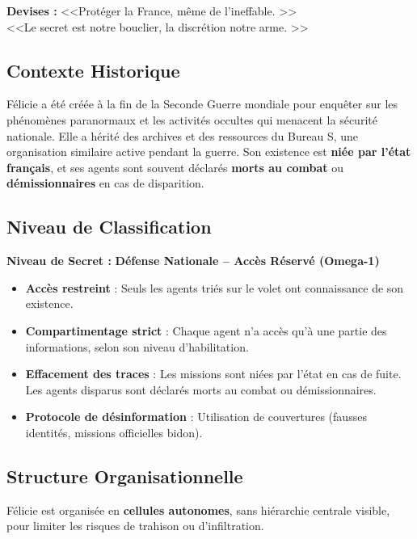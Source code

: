\documentclass[10pt,a5paper,twoside]{book}
\begin{document}
\begin{shaded}
	\textbf{Devises :} <<Protéger la France, même de l'ineffable. >> \\ <<Le secret est notre bouclier, la discrétion notre arme. >>
\end{shaded}

\subsection{Contexte Historique}

Félicie a été créée à la fin de la Seconde Guerre mondiale pour enquêter sur les phénomènes paranormaux et les activités occultes qui menacent la sécurité nationale. Elle a hérité des archives et des ressources du Bureau S, une organisation similaire active pendant la guerre. Son existence est \textbf{niée par l'état français}, et ses agents sont souvent déclarés \textbf{morts au combat} ou \textbf{démissionnaires} en cas de disparition.

\subsection{Niveau de Classification}
\begin{shaded}
	\textbf{Niveau de Secret :} \textbf{Défense Nationale -- Accès Réservé (Omega-1)}
	\begin{itemize}
		\item \textbf{Accès restreint} : Seuls les agents triés sur le volet ont connaissance de son existence.
		\item \textbf{Compartimentage strict} : Chaque agent n'a accès qu'à une partie des informations, selon son niveau d'habilitation.
		\item \textbf{Effacement des traces} : Les missions sont niées par l'état en cas de fuite. Les agents disparus sont déclarés morts au combat ou démissionnaires.
		\item \textbf{Protocole de désinformation} : Utilisation de couvertures (fausses identités, missions officielles bidon).
	\end{itemize}
\end{shaded}

\subsection{Structure Organisationnelle}

Félicie est organisée en \textbf{cellules autonomes}, sans hiérarchie centrale visible, pour limiter les risques de trahison ou d'infiltration.
\end{document}
